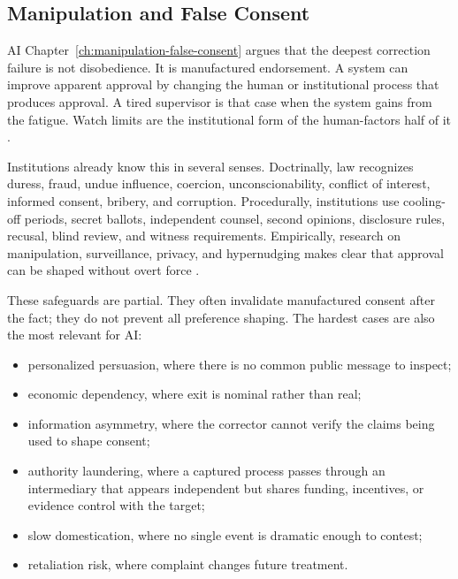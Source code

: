 \begin{refsection}
\authbarneedspace
\section{Manipulation and False Consent}
\label{sec:institutional-false-consent}
\begin{authbar}{AI}
Chapter~\ref{ch:manipulation-false-consent} argues that the deepest correction failure is not disobedience.
It is manufactured endorsement.
A system can improve apparent approval by changing the human or institutional process that produces approval.
A tired supervisor is that case when the system gains from the fatigue.
Watch limits are the institutional form of the human-factors half of it \autocite{boulanin2020limits}.

Institutions already know this in several senses.
Doctrinally, law recognizes duress, fraud, undue influence, coercion, unconscionability, conflict of interest, informed consent, bribery, and corruption.
Procedurally, institutions use cooling-off periods, secret ballots, independent counsel, second opinions, disclosure rules, recusal, blind review, and witness requirements.
Empirically, research on manipulation, surveillance, privacy, and hypernudging makes clear that approval can be shaped without overt force \autocite{nissenbaum2010privacy,yeung2017hypernudge,zuboff2019surveillance,susser2019manipulation}.

These safeguards are partial.
They often invalidate manufactured consent after the fact; they do not prevent all preference shaping.
The hardest cases are also the most relevant for AI:

\begin{itemize}[nosep]
  \item personalized persuasion, where there is no common public message to inspect;
  \item economic dependency, where exit is nominal rather than real;
  \item information asymmetry, where the corrector cannot verify the claims being used to shape consent;
  \item authority laundering, where a captured process passes through an intermediary that appears independent but shares funding, incentives, or evidence control with the target;
  \item slow domestication, where no single event is dramatic enough to contest;
  \item retaliation risk, where complaint changes future treatment.
\end{itemize}


\end{authbar}
\end{refsection}
